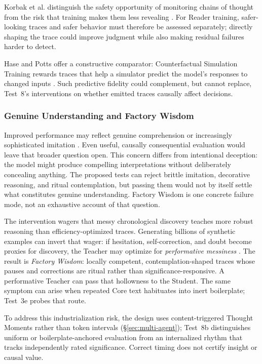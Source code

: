 \documentclass[11pt]{article}
\begin{document}
Korbak et al. distinguish the safety opportunity of monitoring chains of
thought from the risk that training makes them less revealing
\cite{korbak2025monitorability}. For Reader training, safer-looking traces and
safer behavior must therefore be assessed separately; directly shaping the
trace could improve judgment while also making residual failures harder to
detect.

Hase and Potts offer a constructive comparator: Counterfactual Simulation
Training rewards traces that help a simulator predict the model's responses
to changed inputs \cite{hase2026counterfactual}. Such predictive fidelity
could complement, but cannot replace, Test~8's interventions on whether emitted
traces causally affect decisions.

\subsubsection{Genuine Understanding and Factory Wisdom}
\label{sec:hollow-cognition}

Improved performance may reflect genuine comprehension or increasingly
sophisticated imitation
\cite{westerberg2025superintelligence}. Even useful, causally consequential
evaluation would leave that broader question open. This concern differs from
intentional deception: the model might produce compelling interpretations
without deliberately concealing anything. The proposed tests can reject brittle
imitation, decorative reasoning, and ritual contemplation, but passing them
would not by itself settle what constitutes genuine understanding. Factory
Wisdom is one concrete failure mode, not an exhaustive account of that question.

The intervention wagers that messy chronological discovery teaches more robust
reasoning than efficiency-optimized traces. Generating billions of synthetic
examples can invert that wager: if hesitation, self-correction, and doubt become
proxies for discovery, the Teacher may optimize for \emph{performative messiness}
\cite{shumailov2023curse}. The result is \emph{Factory Wisdom}: locally competent, contemplation-shaped traces whose pauses and
corrections are ritual rather than significance-responsive. A performative
Teacher can pass that hollowness to the Student. The same symptom can arise when
repeated Core text habituates into inert boilerplate; Test~3e probes that route.

To address this industrialization risk, the design uses
content-triggered Thought Moments rather than token intervals
(\S\ref{sec:multi-agent}); Test~8b distinguishes uniform or boilerplate-anchored
evaluation from an internalized rhythm that tracks independently rated
significance. Correct timing does not certify insight or causal value.
\end{document}
